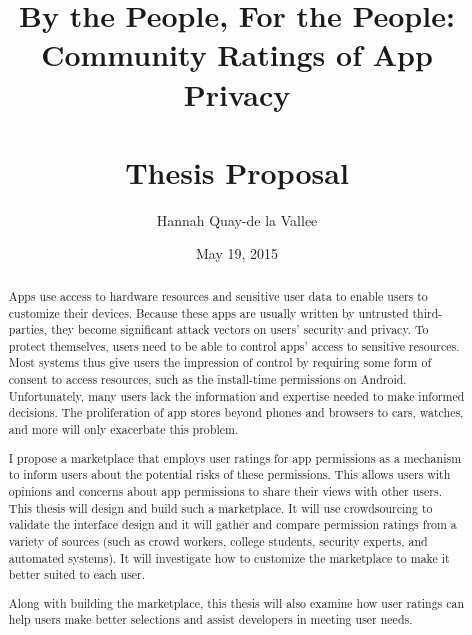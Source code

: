\documentclass[11pt]{article}
\begin{document}
\author{Hannah Quay-de la Vallee}
\title{By the People, For the People: \\ Community Ratings of App Privacy \\ \ \\ Thesis Proposal}
\date{May 19, 2015}

\maketitle

\maketitle %

\newpage

\tableofcontents %

\newpage

\doublespacing


\setcounter{page}{1}
\pagestyle{empty}
\hypersetup{pageanchor=false}


\pagestyle{plain}

\begin{abstract}

Apps use access to hardware resources and sensitive 
user data to enable users to customize their devices. 
Because these apps are usually written by untrusted 
third-parties, they become significant attack vectors 
on users' security and privacy. To protect themselves, 
users need to be able to control apps' access to 
sensitive resources. Most systems thus give users 
the impression of control by requiring some form of 
consent to access resources, 
such as the install-time permissions on Android. 
Unfortunately, many users lack the 
information and expertise needed to make informed 
decisions. The proliferation of app stores beyond 
phones and browsers to cars, watches, and more will 
only exacerbate this problem. 

I propose a marketplace that employs user ratings for 
app permissions as a mechanism to inform users about 
the potential risks of these permissions. This allows 
users with opinions and concerns about app permissions 
to share their views with other users. This thesis will 
design and build such a marketplace. It will use 
crowdsourcing to validate the interface design and it will
gather and compare permission ratings from a variety of 
sources (such as crowd workers, college students, security 
experts, and automated systems). It will investigate how to customize 
the marketplace to make it better suited to each user. 

Along with building the marketplace, this thesis will 
also examine how user ratings can help users make better 
selections and assist developers in meeting user needs.

\end{abstract}
\end{document}
